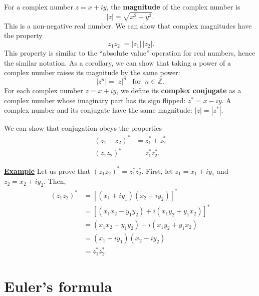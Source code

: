 \documentclass[10pt,a4paper]{article}
\begin{document}
For a complex number $z = x + i y$, the \textbf{magnitude} of the
complex number is
\begin{equation}
  |z| = \sqrt{x^2 + y^2}.
\end{equation}
This is a non-negative real number. We can show that complex
magnitudes have the property
\begin{equation}
  |z_1 z_2| = |z_1| \, |z_2|.
\end{equation}
This property is similar to the ``absolute value'' operation for real
numbers, hence the similar notation.  As a corollary, we can show that
taking a power of a complex number raises its magnitude by the same
power:
\begin{equation}
  |z^n| = |z|^n \;\;\;\textrm{for}\;\;n \in \mathbb{Z}.
\end{equation}
For each complex number $z = x + iy$, we define its \textbf{complex
  conjugate} as a complex number whose imaginary part has its sign
flipped: $z^* = x - i y$. A complex number and its conjugate have the
same magnitude: $|z| = |z^*|$.

We can show that conjugation obeys the properties
\begin{align}
  (z_1 + z_2)^* &= z_1^* + z_2^* \\
  (z_1 z_2)^* &= z_1^* z_2^*.
\end{align}

\begin{framed}
\noindent
\underline{\textbf{Example}}
\vskip 0.1in \noindent
Let us prove that $(z_1 z_2)^* = z_1^* z_2^*$. First, let
$z_1 = x_1 + i y_1$ and $z_2 = x_2 + i y_2$.
Then,
\begin{align*}
  (z_1 z_2)^* &= \left[(x_1+iy_1)(x_2+iy_2)\right]^* \\
  &= \left[\left(x_1 x_2 - y_1 y_2\right) + i\left(x_1y_2+y_1x_2\right)\right]^* \\
  &= \left(x_1 x_2 - y_1 y_2\right) - i\left(x_1y_2+y_1x_2\right) \\
  &= \left(x_1 - i y_1\right)\left(x_2 - i y_2\right) \\
  &= z_1^* z_2^*.
\end{align*}
\end{framed}

\section{Euler's formula}\label{eulers-formula}
\end{document}
